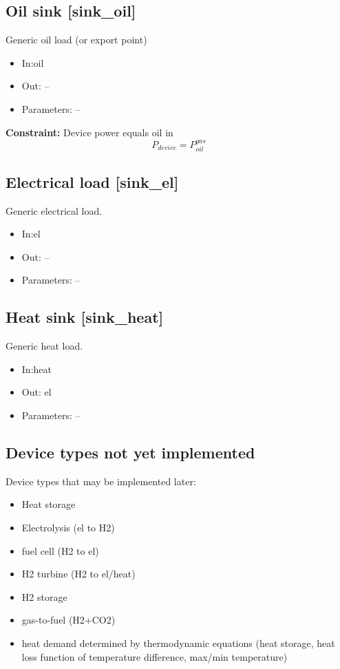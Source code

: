 \documentclass[12pt]{article}
\begin{document}
\subsection{Oil sink [sink\_oil]}

Generic oil load (or export point)

\begin{itemize}
\item In:oil
\item Out: --
\item Parameters: --
\end{itemize}


\textbf{Constraint:}
Device power equals oil in
 \[ P_{device}=P_{oil}^{gas} \] 


\subsection{Electrical load [sink\_el]}

Generic electrical load.

\begin{itemize}
\item In:el
\item Out: --
\item Parameters: --
\end{itemize}



\subsection{Heat sink [sink\_heat]}

Generic heat load.

\begin{itemize}
\item In:heat
\item Out: el
\item Parameters: --
\end{itemize}


\subsection{Device types not yet implemented}
Device types that may be implemented later:
\begin{itemize}
	\item Heat storage
	\item Electrolysis (el to H2)
	\item fuel cell (H2 to el)
	\item H2 turbine (H2 to el/heat)
	\item H2 storage
	\item gas-to-fuel (H2+CO2)
	\item heat demand determined by thermodynamic equations (heat storage, heat loss function of temperature difference, max/min temperature)
\end{itemize}
\end{document}
